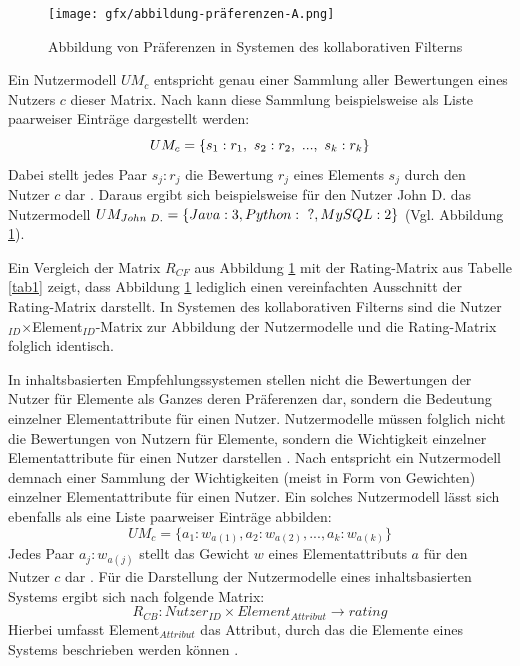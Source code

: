 \begin{figure}[H]
    \centering
	\texttt{[image: gfx/abbildung-präferenzen-A.png]}
	\caption[Abbildung von Präferenzen in Systemen des kollaborativen Filterns]{Abbildung von Präferenzen in Systemen des kollaborativen Filterns}
	\label{fig:empfehlungssysteme:preferences:abb1:1}
\end{figure}

Ein Nutzermodell $UM_{c}$ entspricht genau einer Sammlung aller Bewertungen eines Nutzers $c$ dieser Matrix.
Nach \textcite[S. 41]{berkovsky:2:article} kann diese Sammlung beispielsweise als Liste paarweiser Einträge dargestellt werden:
\begin{equation}\label{eq6}
    UM_{c} = \{s_{1}:r_{1},\textnormal{ }s_{2}:r_{2},\textnormal{ }...,\textnormal{ }s_{k}:r_{k}\}
\end{equation}
Dabei stellt jedes Paar $s_{j}:r_{j}$ die Bewertung $r_{j}$ eines Elements $s_{j}$ durch den Nutzer $c$ dar \cite[S. 41]{berkovsky:2:article}.
Daraus ergibt sich beispielsweise für den Nutzer John D. das Nutzermodell $UM_{John\textnormal{ }D.} = \{Java: 3, Python:\textnormal{ ?}, MySQL: 2\}$ (Vgl. Abbildung \ref{fig:empfehlungssysteme:preferences:abb1:1}).

Ein Vergleich der Matrix $R_{CF}$ aus Abbildung \ref{fig:empfehlungssysteme:preferences:abb1:1} mit der Rating-Matrix aus Tabelle \ref{tab1} zeigt, dass Abbildung \ref{fig:empfehlungssysteme:preferences:abb1:1} lediglich einen vereinfachten Ausschnitt der Rating-Matrix darstellt.
In Systemen des kollaborativen Filterns sind die Nutzer$_{ID}$$\times$Element$_{ID}$-Matrix zur Abbildung der Nutzermodelle und die Rating-Matrix folglich identisch.

In inhaltsbasierten Empfehlungssystemen stellen nicht die Bewertungen der Nutzer für Elemente als Ganzes deren Präferenzen dar, sondern die Bedeutung einzelner Elementattribute für einen Nutzer.
Nutzermodelle müssen folglich nicht die Bewertungen von Nutzern für Elemente, sondern die Wichtigkeit einzelner Elementattribute für einen Nutzer darstellen \cite[S. 42]{berkovsky:2:article}.
Nach \textcite[S. 42]{berkovsky:2:article} entspricht ein Nutzermodell demnach einer Sammlung der Wichtigkeiten (meist in Form von Gewichten) einzelner Elementattribute für einen Nutzer.
Ein solches Nutzermodell lässt sich ebenfalls als eine Liste paarweiser Einträge abbilden:
\begin{equation}\label{eq7}
    UM_{c} = \{a_{1}:w_{a(1)}, a_{2}:w_{a(2)}, ..., a_{k}:w_{a(k)}\}
\end{equation}
Jedes Paar $a_{j}:w_{a(j)}$ stellt das Gewicht $w$ eines Elementattributs $a$ für den Nutzer $c$ dar \cite[S. 42]{berkovsky:2:article}.
Für die Darstellung der Nutzermodelle eines inhaltsbasierten Systems ergibt sich nach \textcite[S. 251]{berkovsky:article} folgende Matrix:
\begin{equation}\label{eq8}
    R_{CB}: Nutzer_{ID} \times Element_{Attribut} \rightarrow rating
\end{equation}
Hierbei umfasst Element$_{Attribut}$ das Attribut, durch das die Elemente eines Systems beschrieben werden können \cite[S. 251]{berkovsky:article}.

